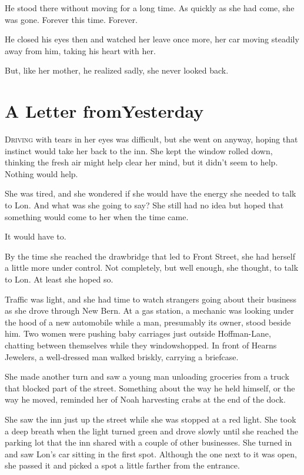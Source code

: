 \documentclass[10pt, twoside, openright]{book}
\newcommand{\chapterornament}[1]{\def\currentornament{#1}}
\def\currentornament{}
\begin{document}
He stood there without moving for a long time. As quickly as she had
come, she was gone. Forever this time. Forever.

He closed his eyes then and watched her leave once more, her car moving
steadily away from him, taking his heart with her.


But, like her mother, he realized sadly, she never looked back.

	\newpage
\thispagestyle{empty}
\clearpage
\null

\chapterornament{89}
\chapter{A Letter fromYesterday}

\lettrine[findent=0.5em, nindent=0.0em]{D}{riving} with tears in her eyes was difficult, but she went on anyway,
hoping that instinct would take her back to the inn. She kept the window
rolled down, thinking the fresh air might help clear her mind, but it
didn't seem to help. Nothing would help.

She was tired, and she wondered if she would have the energy she needed
to talk to Lon. And what was she going to say? She still had no idea but
hoped that something would come to her when the time came.


It would have to.


By the time she reached the drawbridge that led to Front Street, she had
herself a little more under control. Not completely, but well enough,
she thought, to talk to Lon. At least she hoped so.

Traffic was light, and she had time to watch strangers going about their
business as she drove through New Bern. At a gas station, a mechanic was
looking under the hood of a new automobile while a man, presumably its
owner, stood beside him. Two women were pushing baby carriages just
outside Hoffman-Lane, chatting between themselves while they
windowshopped. In front of Hearns Jewelers, a well-dressed man walked
briskly, carrying a briefcase.

She made another turn and saw a young man unloading groceries from a
truck that blocked part of the street. Something about the way he held
himself, or the way he moved, reminded her of Noah harvesting crabs at
the end of the dock.

She saw the inn just up the street while she was stopped at a red light.
She took a deep breath when the light turned green and drove slowly
until she reached the parking lot that the inn shared with a couple of
other businesses. She turned in and saw Lon's car sitting in the first
spot. Although the one next to it was open, she passed it and picked a
spot a little farther from the entrance.
\end{document}
